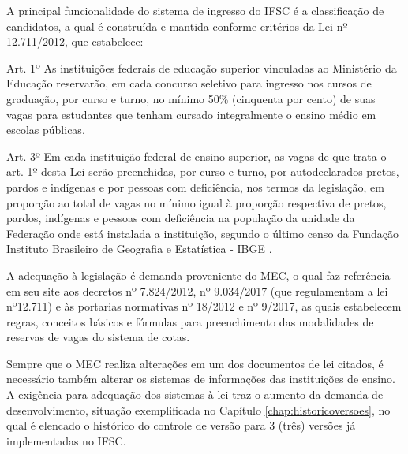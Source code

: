  A principal funcionalidade do sistema de ingresso do \gls{IFSC} é a classificação de candidatos, a qual é construída e mantida conforme critérios da Lei nº 12.711/2012, que estabelece:
 \begin{citacao}
 Art. 1º As instituições federais de educação superior vinculadas ao Ministério da Educação reservarão, em cada concurso seletivo para ingresso nos cursos de graduação, por curso e turno, no mínimo 50\% (cinquenta por cento) de suas vagas para estudantes que tenham cursado integralmente o ensino médio em escolas públicas.
 
 Art. 3º Em cada instituição federal de ensino superior, as vagas de que trata o art. 1º desta Lei serão preenchidas, por curso e turno, por autodeclarados pretos, pardos e indígenas e por pessoas com deficiência, nos termos da legislação, em proporção ao total de vagas no mínimo igual à proporção respectiva de pretos, pardos, indígenas e pessoas com deficiência na população da unidade da Federação onde está instalada a instituição, segundo o último censo da Fundação Instituto Brasileiro de Geografia e Estatística - IBGE \cite{leicotas}.  
 \end{citacao}
 
 A adequação à legislação é demanda proveniente do \gls{MEC}, o qual faz referência em seu site aos decretos nº 7.824/2012, nº 9.034/2017 (que regulamentam a lei nº12.711) e às portarias normativas nº 18/2012 e nº 9/2017, as quais estabelecem regras, conceitos básicos e fórmulas para preenchimento das modalidades de reservas de vagas do sistema de cotas. 
 
 Sempre que o \gls{MEC} realiza alterações em um dos documentos de lei citados, é necessário também alterar os sistemas de informações das instituições de ensino. A exigência para adequação dos sistemas à lei traz o aumento da demanda de desenvolvimento, situação exemplificada no Capítulo  \ref{chap:historicoversoes}, no qual é elencado o histórico do controle de versão para 3 (três) versões já implementadas no \gls{IFSC}.
 
 

 
 